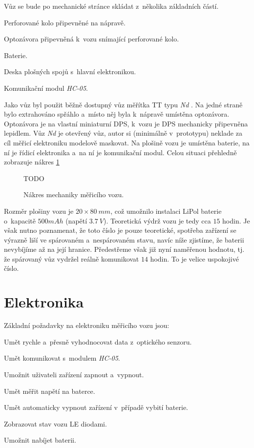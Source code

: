 Vůz se bude po mechanické stránce skládat z~několika základních částí.

\begin{compactenum}
\item Perforované kolo připevněné na nápravě.
\item Optozávora připevněná k~vozu snímající perforované kolo.
\item Baterie.
\item Deska plošných spojů s~hlavní elektronikou.
\item Komunikační modul \textit{HC-05}.
\end{compactenum}

Jako vůz byl použit běžně dostupný vůz měřítka TT typu \textit{Nd}
\cite{vuz-nd}. Na jedné straně bylo extrahováno spřáhlo a~místo něj byla
k~nápravě umístěna optozávora. Optozávora je na vlastní miniaturní DPS, k~vozu
je DPS mechanicky připevněna lepidlem. Vůz \textit{Nd} je otevřený vůz, autor si
(minimálně v~prototypu) neklade za cíl měřicí elektroniku modelově maskovat. Na
plošině vozu je umístěna baterie, na ní je řídicí elektronika a~na ní je
komunikační modul. Celou situaci přehledně zobrazuje nákres
\ref{fig:vuz-nakres}

\begin{figure}[h]
TODO
\caption{Nákres mechaniky měřicího vozu.}
\label{fig:vuz-nakres}
\end{figure}

Rozměr plošiny vozu je $20\times80\ mm$, což umožnilo instalaci LiPol baterie
o~kapacitě $500 mAh$ (napětí $3.7\ V$). Teoretická výdrž vozu je tedy cca $15$
hodin. Je však nutno poznamenat, že toto číslo je pouze teoretické, spotřeba
zařízení se výrazně liší ve spárovaném a~nespárovaném stavu, navíc níže
zjistíme, že baterii nevybíjíme až na její hranice. Předestřeme však již nyní
naměřenou hodnotu, tj. že spárovaný vůz vydržel reálně komunikovat $14$ hodin.
To je velice uspokojivé číslo.

\section{Elektronika}
\label{sec:wsm-ele}

Základní požadavky na elektroniku měřicího vozu jsou:

\begin{compactenum}
\item Umět rychle a~přesně vyhodnocovat data z~optického senzoru.
\item Umět komunikovat s~modulem \textit{HC-05}.
\item Umožnit uživateli zařízení zapnout a~vypnout.
\item Umět měřit napětí na baterce.
\item Umět automaticky vypnout zařízení v~případě vybití baterie.
\item Zobrazovat stav vozu LE diodami.
\item Umožnit nabíjet baterii.
\end{compactenum}

